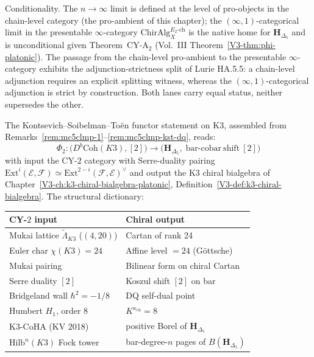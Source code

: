 \begin{remark}
Conditionality. The $n\to\infty$ limit is defined at the level of
pro-objects in the chain-level category (the pro-ambient of this
chapter); the $(\infty,1)$-categorical limit in the presentable
$\infty$-category $\mathrm{ChirAlg}^{E_2\text{-}\mathrm{ch}}_X$ is the
native home for $\mathbf{H}_{\Delta_5}$ and is unconditional given
Theorem~CY-A$_2$ (Vol.~III
Theorem~\ref{V3-thm:phi-platonic}). The passage from the chain-level
pro-ambient to the presentable $\infty$-category exhibits the
adjunction-strictness split of Lurie HA.5.5: a chain-level adjunction
requires an explicit splitting witness, whereas the $(\infty,1)$-categorical
adjunction is strict by construction. Both lanes carry equal status,
neither supersedes the other.
\end{remark}

\begin{remark}
\label{rem:mc5clmp-kst-phi}
\ClaimStatusConditional
The Kontsevich--Soibelman--To\"en functor statement on K3, assembled
from Remarks~\textup{\ref{rem:mc5clmp-1}}--\textup{\ref{rem:mc5clmp-kst-dq}},
reads:
\[
 \Phi_2 \colon
 \bigl(D^b\mathrm{Coh}(K3), [2]\bigr)
 \longrightarrow
 \bigl(\mathbf{H}_{\Delta_5},\;
 \mathrm{bar\text{-}cobar\ shift}\ [2]\bigr)
\]
with input the CY-$2$ category with Serre-duality pairing
$\mathrm{Ext}^i(\mathcal{E},\mathcal{F}) \simeq \mathrm{Ext}^{2-i}(\mathcal{F},\mathcal{E})^\vee$
and output the K3 chiral bialgebra of
Chapter~\ref{V3-ch:k3-chiral-bialgebra-platonic},
Definition~\ref{V3-def:k3-chiral-bialgebra}. The structural dictionary:
\begin{center}
\renewcommand{\arraystretch}{1.2}
\begin{tabular}{ll}
\toprule
CY-$2$ input & Chiral output \\
\midrule
Mukai lattice $\widetilde{\Lambda}_{K3}$ ($(4,20)$) & Cartan of rank 24 \\
Euler char $\chi(K3) = 24$ & Affine level $= 24$ (G\"ottsche) \\
Mukai pairing & Bilinear form on chiral Cartan \\
Serre duality $[2]$ & Koszul shift $[2]$ on bar \\
Bridgeland wall $\hbar^2 = -1/8$ & DQ self-dual point \\
Humbert $H_1$, order $8$ & $K^{\kappa_{\mathrm{ch}}} = 8$ \\
K3-CoHA (KV 2018) & positive Borel of $\mathbf{H}_{\Delta_5}$ \\
$\mathrm{Hilb}^n(K3)$ Fock tower & bar-degree-$n$ pages of $B(\mathbf{H}_{\Delta_5})$ \\

\end{tabular}
\end{center}
\end{remark}
